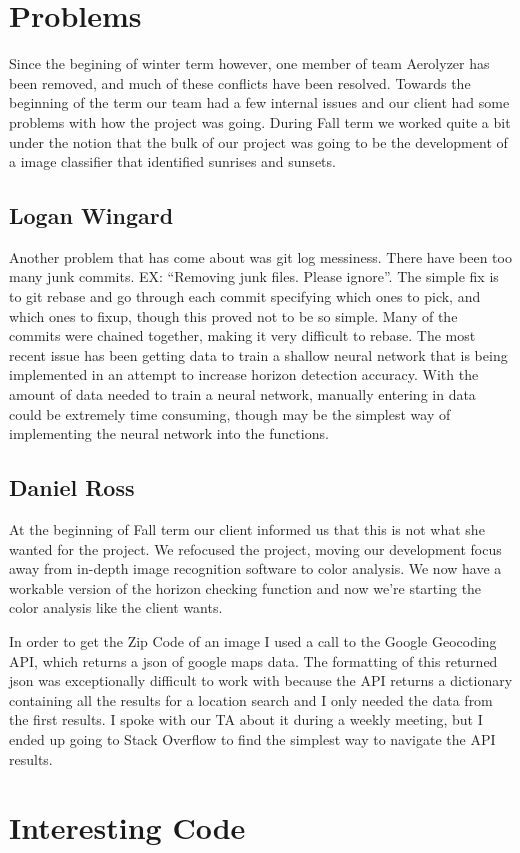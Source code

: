 \documentclass[onecolumn, draftclsnofoot,10pt, compsoc]{IEEEtran}
\begin{document}
\begin{singlespace}
	\section{Problems}
		Since the begining of winter term however, one member of team Aerolyzer has been removed, and much of these conflicts have been resolved.
		Towards the beginning of the term our team had a few internal issues and our client had some problems with how the project was going.
		During Fall term we worked quite a bit under the notion that the bulk of our project was going to be the development of a image classifier that identified sunrises and sunsets.
		\subsection{Logan Wingard}
			Another problem that has come about was git log messiness.
			There have been too many junk commits.
            EX: ``Removing junk files. Please ignore''.
			The simple fix is to git rebase and go through each commit specifying which ones to pick, and which ones to fixup, though this proved not to be so simple.
			Many of the commits were chained together, making it very difficult to rebase.
			The most recent issue has been getting data to train a shallow neural network that is being implemented in an attempt to increase horizon detection accuracy.
			With the amount of data needed to train a neural network, manually entering in data could be extremely time consuming, though may be the simplest way of implementing the neural network into the functions.
		\subsection{Daniel Ross}
			At the beginning of Fall term our client informed us that this is not what she wanted for the project.
			We refocused the project, moving our development focus away from in-depth image recognition software to color analysis.
			We now have a workable version of the horizon checking function and now we're starting the color analysis like the client wants.

			In order to get the Zip Code of an image I used a call to the Google Geocoding API, which returns a json of google maps data.
			The formatting of this returned json was exceptionally difficult to work with because the API returns a dictionary containing all the results for a location search and I only needed the data from the first results.
			I spoke with our TA about it during a weekly meeting, but I ended up going to Stack Overflow to find the simplest way to navigate the API results.
		
	\section{Interesting Code}


\end{singlespace}
\end{document}

